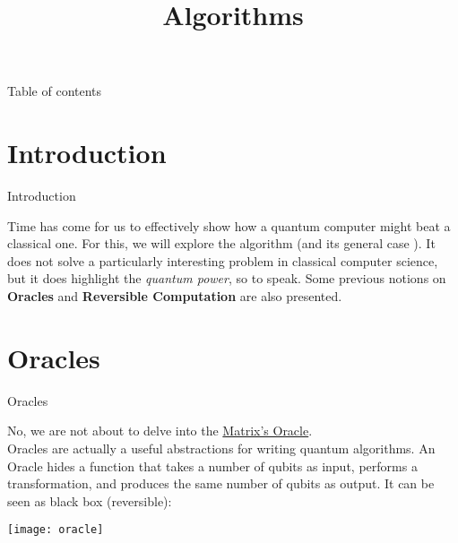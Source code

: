 \documentclass[aspectratio=43]{beamer}
\title{\q Algorithms}
\begin{document}
\begin{frame}
	\titlepage
\end{frame}


\begin{frame}{Table of contents}
	\begin{card}
		\tableofcontents
	\end{card}
\end{frame}


\section{Introduction}
\begin{frame}{Introduction}
    \begin{card}
        Time has come for us to effectively show how a quantum computer might beat a classical one. For this, we will explore the \ds algorithm (and its general case \djs). It does not solve a particularly interesting problem in classical computer science, but it does highlight the \textit{quantum power}, so to speak. Some previous notions on \textbf{\q Oracles} and \textbf{Reversible Computation} are also presented.
    \end{card}
\pagenumber
\end{frame}

\section{\q Oracles}
\begin{frame}{\q Oracles}
\begin{card}
    No, we are not about to delve into the \href{https://en.wikipedia.org/wiki/The_Oracle_(The_Matrix)}{Matrix's Oracle}.\\
    \q Oracles are actually a useful abstractions for writing quantum algorithms. An Oracle hides a function that takes a number of qubits as input, performs a transformation, and produces the same number of qubits as output. It can be seen as black box (reversible):
    \begin{center}
        \texttt{[image: oracle]}
    \end{center}
\end{card}
\pagenumber
\end{frame}
\end{document}
